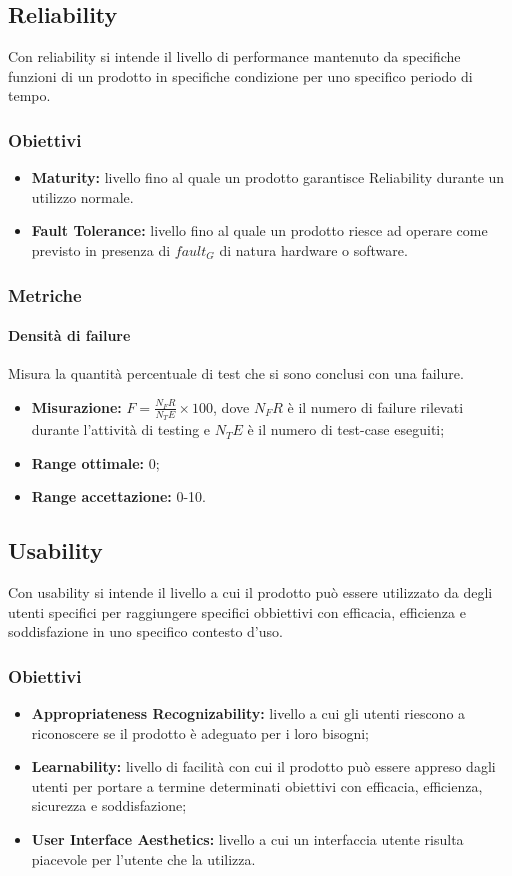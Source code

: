 	\subsection{Reliability}
		Con reliability si intende il livello di performance mantenuto da specifiche funzioni di un prodotto in specifiche condizione per uno specifico periodo di tempo.
		\subsubsection{Obiettivi}
		\begin{itemize}
			\item {\textbf{Maturity:} livello fino al quale un prodotto garantisce Reliability durante un utilizzo normale.}
			\item {\textbf{Fault Tolerance:} livello fino al quale un prodotto riesce ad operare come previsto in presenza di $fault_G$ di natura hardware o software.}
		\end{itemize}
		\subsubsection{Metriche}
			\paragraph{Densità di failure} \Spazio
			Misura la quantità percentuale di test che si sono conclusi con una failure.
			\begin{itemize}
				\item {\textbf{Misurazione:} $F=\frac{N_FR}{N_TE}\times 100$, dove $N_FR$ è il numero di failure rilevati durante l'attività di testing e $N_TE$ è il numero di test-case eseguiti};
				\item {\textbf{Range ottimale:} 0;}
				\item {\textbf{Range accettazione:} 0-10.}
			\end{itemize} 
			
	\subsection{Usability}
		Con usability si intende il livello a cui il prodotto può essere utilizzato da degli utenti specifici per raggiungere specifici obbiettivi con efficacia, efficienza e soddisfazione in uno specifico contesto d'uso.  
		\subsubsection{Obiettivi}
		\begin{itemize}
			\item {\textbf{Appropriateness Recognizability:} livello a cui gli utenti riescono a riconoscere se il prodotto è adeguato per i loro bisogni;}
			\item {\textbf{Learnability:} livello di facilità con cui il prodotto può essere appreso dagli utenti per portare a termine determinati obiettivi con efficacia, efficienza, sicurezza e soddisfazione;} 
			\item {\textbf{User Interface Aesthetics:} livello a cui un interfaccia utente risulta piacevole per l'utente che la utilizza. }
			
		\end{itemize}
